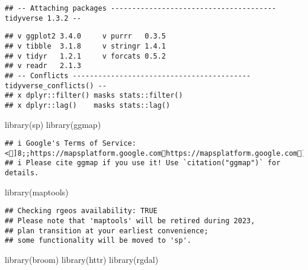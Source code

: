 \documentclass[
]{article}
\newenvironment{Shaded}{\begin{snugshade}}{\end{snugshade}}
\newcommand{\FunctionTok}[1]{\textcolor[rgb]{0.00,0.00,0.00}{#1}}
\newcommand{\NormalTok}[1]{#1}
\begin{document}
\begin{verbatim}
## -- Attaching packages --------------------------------------- tidyverse 1.3.2 --
\end{verbatim}

\begin{verbatim}
## v ggplot2 3.4.0     v purrr   0.3.5
## v tibble  3.1.8     v stringr 1.4.1
## v tidyr   1.2.1     v forcats 0.5.2
## v readr   2.1.3     
## -- Conflicts ------------------------------------------ tidyverse_conflicts() --
## x dplyr::filter() masks stats::filter()
## x dplyr::lag()    masks stats::lag()
\end{verbatim}

\begin{Shaded}
\begin{Highlighting}[]
\FunctionTok{library}\NormalTok{(sp)}
\FunctionTok{library}\NormalTok{(ggmap)}
\end{Highlighting}
\end{Shaded}

\begin{verbatim}
## i Google's Terms of Service: <]8;;https://mapsplatform.google.comhttps://mapsplatform.google.com]8;;>
## i Please cite ggmap if you use it! Use `citation("ggmap")` for details.
\end{verbatim}

\begin{Shaded}
\begin{Highlighting}[]
\FunctionTok{library}\NormalTok{(maptools)}
\end{Highlighting}
\end{Shaded}

\begin{verbatim}
## Checking rgeos availability: TRUE
## Please note that 'maptools' will be retired during 2023,
## plan transition at your earliest convenience;
## some functionality will be moved to 'sp'.
\end{verbatim}

\begin{Shaded}
\begin{Highlighting}[]
\FunctionTok{library}\NormalTok{(broom)}
\FunctionTok{library}\NormalTok{(httr)}
\FunctionTok{library}\NormalTok{(rgdal)}
\end{Highlighting}
\end{Shaded}
\end{document}
